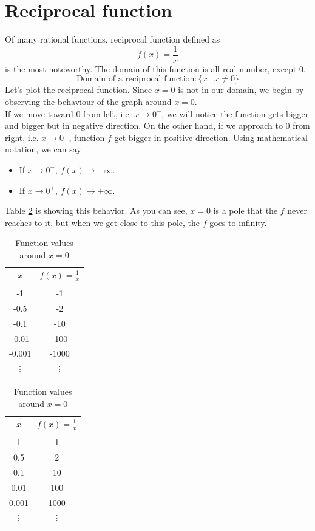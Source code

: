\section{Reciprocal function}
Of many rational functions, reciprocal function defined as 
%
\begin{equation}
    f(x)=\frac{1}{x}
    \label{reciprocal_funct}
\end{equation}
%
is the most noteworthy. The domain of this function is all real number, except 0.
%
\begin{equation*}
    \text{Domain of a reciprocal function}: \{x \mid x\neq0\}
\end{equation*}
%
Let's plot the reciprocal function. Since $x=0$ is not in our domain, we begin by observing the behaviour of the graph around $x=0$.\\
If we move toward $0$ from left, i.e. $x \rightarrow 0^-$, we will notice the function gets bigger and bigger but in negative direction. On the other hand, if we approach to $0$ from right, i.e. $x \rightarrow 0^+$, function $f$ get bigger in positive direction. Using mathematical notation, we can say
%
\begin{itemize}
    \item If $x \rightarrow 0^-$, $f(x) \rightarrow -\infty$.
    \item If $x \rightarrow 0^+$, $f(x) \rightarrow +\infty$.
\end{itemize}
%
Table \ref{tab:reciprocal_zero} is showing this behavior. As you can see, $x=0$ is a pole that the $f$ never reaches to it, but when we get close to this pole, the $f$ goes to infinity.
\begin{table}[ht]
\centering
\caption{Function values around $x=0$}

\begin{tabular}{c|c}
    $x$ & $f(x)=\frac{1}{x}$ \\
    \\[-1em]
    \hline
    -1     & -1 \\
    -0.5   & -2 \\
    -0.1   & -10 \\
    -0.01  & -100 \\
    -0.001 & -1000 \\
    \vdots & \vdots
\end{tabular}
\qquad
\begin{tabular}{c|c}
    $x$ & $f(x)=\frac{1}{x}$ \\
    \\[-1em]
    \hline
    1     & 1 \\
    0.5   & 2 \\
    0.1   & 10 \\
    0.01  & 100 \\
    0.001 & 1000 \\
    \vdots & \vdots
\end{tabular}
\label{tab:reciprocal_zero}
\end{table}


